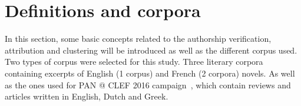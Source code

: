 \chapter{Definitions and corpora \label{sec:definitions_and_corpora}}

In this section, some basic concepts related to the authorship verification, attribution and clustering will be introduced as well as the different corpus used.
Two types of corpus were selected for this study.
Three literary corpora containing excerpts of English (1 corpus) and French (2 corpora) novels.
As well as the ones used for PAN @ CLEF 2016 campaign~\cite{pan16}, which contain reviews and articles written in English, Dutch and Greek.








